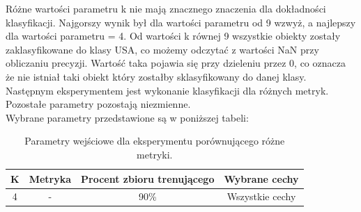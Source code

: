 \documentclass{classrep}
\begin{document}
Różne wartości parametru k nie mają znacznego znaczenia dla dokładności klasyfikacji. Najgorszy wynik był dla wartości parametru od 9 wzwyż, a najlepszy dla wartości parametru = 4. Od wartości k równej 9 wszystkie obiekty zostały zaklasyfikowane do klasy USA, co możemy odczytać z wartości NaN przy obliczaniu precyzji. Wartość taka pojawia się przy dzieleniu przez 0, co oznacza że nie istniał taki obiekt który zostałby sklasyfikowany do danej klasy. \\



Następnym eksperymentem jest wykonanie klasyfikacji dla różnych metryk. Pozostałe parametry pozostają niezmienne.\\

Wybrane parametry przedstawione są w poniższej tabeli:
 
\begin{table}[h!]
\caption{Parametry wejściowe dla eksperymentu porównującego różne metryki. }
\centering
\vspace{0.1cm}
 \begin{tabular}{c c c c}
    \textbf{K} & \textbf{Metryka}   & \textbf{Procent zbioru trenującego}  & \textbf{Wybrane cechy}   \\
\hline
4 & - & 90\% &  Wszystkie cechy\\
\end {tabular}
\label {Parametry wejściowe dla eksperymentu porównującego różne metryki. }
\end{table}
\end{document}
